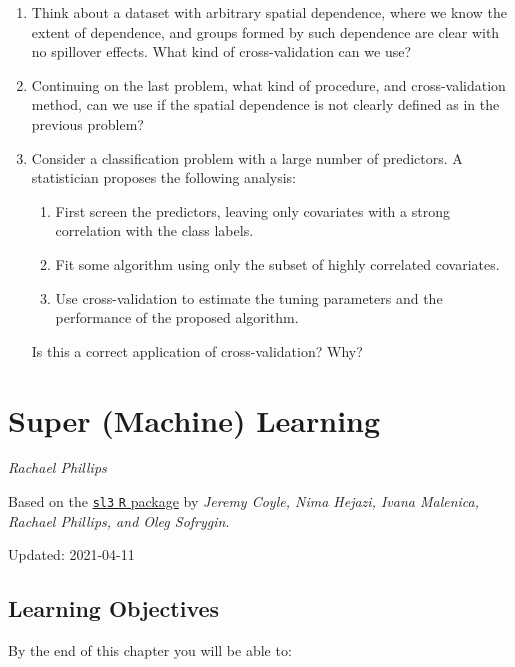 \documentclass[12pt, krantz2,]{krantz}
\providecommand{\tightlist}{%
  \setlength{\itemsep}{0pt}\setlength{\parskip}{0pt}}
\theoremstyle{definition}
\theoremstyle{definition}
\theoremstyle{definition}
\newcommand{\1}{\mathbbm{1}}
\begin{document}
\begin{enumerate}
\def\labelenumi{\arabic{enumi}.}
\item
  Think about a dataset with arbitrary spatial dependence, where we know
  the extent of dependence, and groups formed by such dependence are clear
  with no spillover effects. What kind of cross-validation can we use?
\item
  Continuing on the last problem, what kind of procedure, and cross-validation
  method, can we use if the spatial dependence is not clearly defined as in the
  previous problem?
\item
  Consider a classification problem with a large number of predictors. A
  statistician proposes the following analysis:

  \begin{enumerate}
  \def\labelenumii{\alph{enumii}.}
  \tightlist
  \item
    First screen the predictors, leaving only covariates with a strong
    correlation with the class labels.
  \item
    Fit some algorithm using only the subset of highly correlated covariates.
  \item
    Use cross-validation to estimate the tuning parameters and the performance
    of the proposed algorithm.
  \end{enumerate}

  Is this a correct application of cross-validation? Why?
\end{enumerate}

\hypertarget{sl3}{%
\section{Super (Machine) Learning}\label{sl3}}

\emph{Rachael Phillips}

Based on the \href{https://github.com/tlverse/sl3}{\texttt{sl3} \texttt{R} package} by \emph{Jeremy
Coyle, Nima Hejazi, Ivana Malenica, Rachael Phillips, and Oleg Sofrygin}.

Updated: 2021-04-11

\hypertarget{learning-objectives-3}{%
\subsection*{Learning Objectives}\label{learning-objectives-3}}


By the end of this chapter you will be able to:
\end{document}
